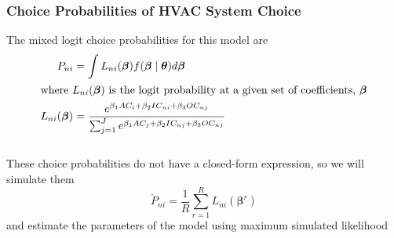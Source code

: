 \documentclass{beamer}\usepackage[]{graphicx}\usepackage[]{xcolor}
\begin{document}
\begin{frame}\frametitle{Choice Probabilities of HVAC System Choice}
	The mixed logit choice probabilities for this model are
    \begin{align*}
        P_{ni} & = \int L_{ni}(\bm{\beta}) f(\bm{\beta} \mid \bm{\theta}) d \bm{\beta} \\
        \intertext{where $L_{ni}(\bm{\beta})$ is the logit probability at a given set of coefficients, $\bm{\beta}$}
        L_{ni}(\bm{\beta}) & = \frac{e^{\beta_1 AC_i + \beta_2 IC_{ni} + \beta_3 OC_{nj}}}{\sum_{j = 1}^J e^{\beta_1 AC_j + \beta_2 IC_{nj} + \beta_3 OC_{nj}}}
    \end{align*} \\
    \vspace{3ex}
    These choice probabilities do not have a closed-form expression, so we will simulate them
    $$\check{P}_{ni} = \frac{1}{R} \sum_{r = 1}^R L_{ni}(\bm{\beta}^r)$$
    and estimate the parameters of the model using maximum simulated likelihood
\end{frame}
\end{document}
